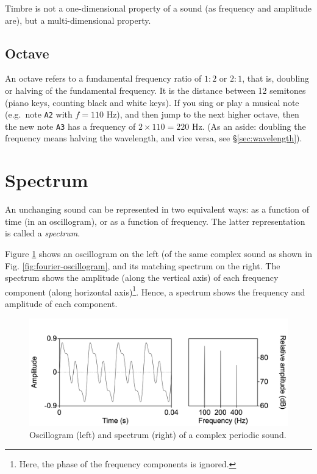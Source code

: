\documentclass[
]{book}
\begin{document}
Timbre is not a one-dimensional property of a sound (as frequency and amplitude are), but a multi-dimensional property.

\subsection{Octave}\label{octave}

An octave refers to a fundamental frequency ratio of \(1:2\) or \(2:1\), that is, doubling or halving of the fundamental frequency. It is the distance between 12 semitones (piano keys, counting black and white keys). If you sing or play a musical note (e.g.~note \texttt{A2} with \(f=110\) Hz), and then jump to the next higher octave, then the new note \texttt{A3} has a frequency of \(2 \times 110=220\) Hz.
(As an aside: doubling the frequency means halving the wavelength, and vice versa, see §\ref{sec:wavelength}).

\section{Spectrum}\label{spectrum}

An unchanging sound can be represented in two equivalent ways: as a function of time (in an oscillogram), or as a function of frequency. The latter representation is called a \emph{spectrum}.

Figure \ref{fig:complex100n200n400} shows an oscillogram on the left (of the same complex sound as shown in Fig. \ref{fig:fourier-oscillogram}, and its matching spectrum on the right. The spectrum shows the amplitude (along the vertical axis) of each frequency component (along horizontal axis)\footnote{Here, the phase of the frequency components is ignored.}. Hence, a spectrum shows the frequency and amplitude of each component.

\begin{figure}

{\centering \includegraphics{figures/complex100n200n400} 

}

\caption{Oscillogram (left) and spectrum (right) of a complex periodic sound.}\label{fig:complex100n200n400}
\end{figure}
\end{document}
